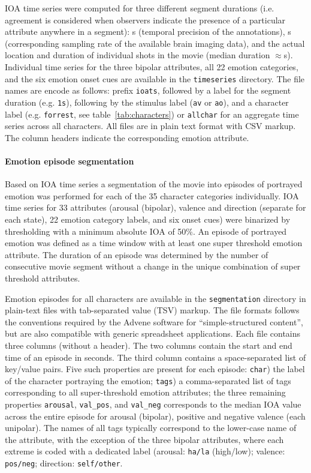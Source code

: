 IOA time series were computed for three different segment durations (i.e.
agreement is considered when observers indicate the presence of a particular
attribute anywhere in a segment): \unit[1]{s} (temporal precision of the
annotations), \unit[2]{s} (corresponding sampling rate of the available brain
imaging data), and the actual location and duration of individual shots in the
movie (median duration $\approx$\unit[5]{s}). Individual time series for the
three bipolar attributes, all 22 emotion categories, and the six emotion onset
cues are available in the \texttt{timeseries} directory. The file names are
encode as follows: prefix \texttt{ioats}, followed by a label for the segment
duration (e.g. \texttt{1s}), following by the stimulus label (\texttt{av} or
\texttt{ao}), and a character label (e.g. \texttt{forrest}, see
table~\ref{tab:characters}) or \texttt{allchar} for an aggregate time series
across all characters. All files are in plain text format with CSV markup. The
column headers indicate the corresponding emotion attribute.

\paragraph{Emotion episode segmentation}

Based on IOA time series a segmentation of the movie into episodes of portrayed
emotion was performed for each of the 35 character categories individually. IOA
time series for 33 attributes (arousal (bipolar), valence and direction
(separate for each state), 22 emotion category labels, and six onset cues) were
binarized by thresholding with a minimum absolute IOA of 50\%.  An episode of
portrayed emotion was defined as a time window with at least one super
threshold emotion attribute. The duration of an episode was determined by the
number of consecutive movie segment without a change in the unique combination
of super threshold attributes.

Emotion episodes for all characters are available in the \texttt{segmentation}
directory in plain-text files with tab-separated value (TSV) markup. The file
formats follows the conventions required by the Advene software for
``simple-structured content'', but are also compatible with generic spreadsheet
applications. Each file contains three columns (without a header). The two
columns contain the start and end time of an episode in seconds. The third
column contains a space-separated list of key/value pairs. Five such properties
are present for each episode: \texttt{char}) the label of the character
portraying the emotion; \texttt{tags}) a comma-separated list of tags
corresponding to all super-threshold emotion attributes; the three remaining
properties \texttt{arousal}, \texttt{val\_pos}, and \texttt{val\_neg}
corresponds to the median IOA value across the entire episode for arousal
(bipolar), positive and negative valence (each unipolar). The names of all tags
typically correspond to the lower-case name of the attribute, with the
exception of the three bipolar attributes, where each extreme is coded with a
dedicated label (arousal: \texttt{ha/la} (high/low); valence: \texttt{pos/neg};
direction: \texttt{self/other}.

